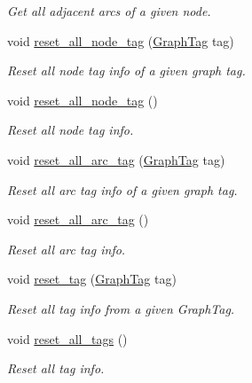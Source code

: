 \begin{DoxyCompactItemize}
\begin{DoxyCompactList}\small\item\em Get all adjacent arcs of a given node. \end{DoxyCompactList}\item 
void \hyperlink{class_designar_1_1_base_graph_a07ca1909d77210157b8b9571a4d35d6c}{reset\+\_\+all\+\_\+node\+\_\+tag} (\hyperlink{namespace_designar_ac91366256ea6ea6ac5fd483d55a7499e}{Graph\+Tag} tag)
\begin{DoxyCompactList}\small\item\em Reset all node tag info of a given graph tag. \end{DoxyCompactList}\item 
void \hyperlink{class_designar_1_1_base_graph_a7bffa4f055b15f76d12bd7c40730a3dd}{reset\+\_\+all\+\_\+node\+\_\+tag} ()
\begin{DoxyCompactList}\small\item\em Reset all node tag info. \end{DoxyCompactList}\item 
void \hyperlink{class_designar_1_1_base_graph_ab73705a167e91d0982a9f149b1d7e71b}{reset\+\_\+all\+\_\+arc\+\_\+tag} (\hyperlink{namespace_designar_ac91366256ea6ea6ac5fd483d55a7499e}{Graph\+Tag} tag)
\begin{DoxyCompactList}\small\item\em Reset all arc tag info of a given graph tag. \end{DoxyCompactList}\item 
void \hyperlink{class_designar_1_1_base_graph_af9ae2a4dfd676090de4b4fa04414989c}{reset\+\_\+all\+\_\+arc\+\_\+tag} ()
\begin{DoxyCompactList}\small\item\em Reset all arc tag info. \end{DoxyCompactList}\item 
void \hyperlink{class_designar_1_1_base_graph_ae8845b2eb9d33f62684c8e5acc7c91b7}{reset\+\_\+tag} (\hyperlink{namespace_designar_ac91366256ea6ea6ac5fd483d55a7499e}{Graph\+Tag} tag)
\begin{DoxyCompactList}\small\item\em Reset all tag info from a given Graph\+Tag. \end{DoxyCompactList}\item 
void \hyperlink{class_designar_1_1_base_graph_ae62e72668468a2aaa3ddc91246e1ee1c}{reset\+\_\+all\+\_\+tags} ()
\begin{DoxyCompactList}\small\item\em Reset all tag info. \end{DoxyCompactList}\item 

\end{DoxyCompactItemize}
